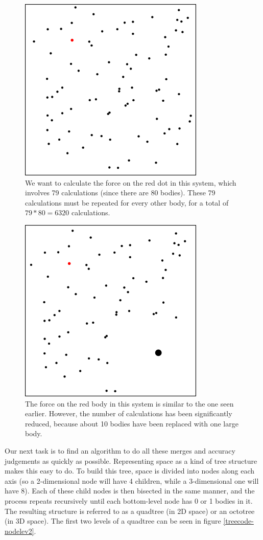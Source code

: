 \documentclass[12pt,twoside]{reedthesis}
\begin{document}
\begin{figure}[p]
	\includegraphics{imgs/treecode-basic}
	\caption{We want to calculate the force on the red dot in this system, which involves 79 calculations (since there are 80 bodies). These 79 calculations must be repeated for every other body, for a total of $79*80=6320$ calculations.}
	\label{treecode-basic}
\end{figure}

\begin{figure}[p]
	\includegraphics{imgs/treecode-merged}
	\caption{The force on the red body in this system is similar to the one seen earlier. However, the number of calculations has been significantly reduced, because about 10 bodies have been replaced with one large body.}
	\label{treecode-merged}
\end{figure}

Our next task is to find an algorithm to do all these merges and accuracy judgements as quickly as possible. Representing space as a kind of tree structure makes this easy to do. To build this tree, space is divided into nodes along each axis (so a 2-dimensional node will have 4 children, while a 3-dimensional one will have 8). Each of these child nodes is then bisected in the same manner, and the process repeats recursively until each bottom-level node has 0 or 1 bodies in it. The resulting structure is referred to as a quadtree (in 2D space) or an octotree (in 3D space). The first two levels of a quadtree can be seen in figure \ref{treecode-nodelev2}. 
\end{document}
